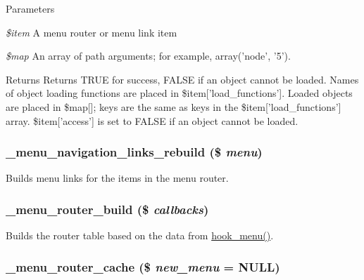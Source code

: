 \begin{DoxyParams}{Parameters}
\item[{\em \$item}]A menu router or menu link item \item[{\em \$map}]An array of path arguments; for example, array('node', '5').\end{DoxyParams}
\begin{DoxyReturn}{Returns}
Returns TRUE for success, FALSE if an object cannot be loaded. Names of object loading functions are placed in \$item\mbox{[}'load\_\-functions'\mbox{]}. Loaded objects are placed in \$map\mbox{[}\mbox{]}; keys are the same as keys in the \$item\mbox{[}'load\_\-functions'\mbox{]} array. \$item\mbox{[}'access'\mbox{]} is set to FALSE if an object cannot be loaded. 
\end{DoxyReturn}
\hypertarget{group__menu_ga69fdf86c20d033bc7ba46a14937e20ea}{
\subsubsection[{\_\-menu\_\-navigation\_\-links\_\-rebuild}]{\setlength{\rightskip}{0pt plus 5cm}\_\-menu\_\-navigation\_\-links\_\-rebuild (\$ {\em menu})}}
\label{group__menu_ga69fdf86c20d033bc7ba46a14937e20ea}
Builds menu links for the items in the menu router. \hypertarget{group__menu_ga662b13ca71a8b780c9a3b372b25492c3}{
\subsubsection[{\_\-menu\_\-router\_\-build}]{\setlength{\rightskip}{0pt plus 5cm}\_\-menu\_\-router\_\-build (\$ {\em callbacks})}}
\label{group__menu_ga662b13ca71a8b780c9a3b372b25492c3}
Builds the router table based on the data from \hyperlink{group__hooks_ga5c95244fea59b25666e409759e133ded}{hook\_\-menu()}. \hypertarget{group__menu_ga02af3d3800722e9ff5be36485b655905}{
\subsubsection[{\_\-menu\_\-router\_\-cache}]{\setlength{\rightskip}{0pt plus 5cm}\_\-menu\_\-router\_\-cache (\$ {\em new\_\-menu} = {\ttfamily NULL})}}
